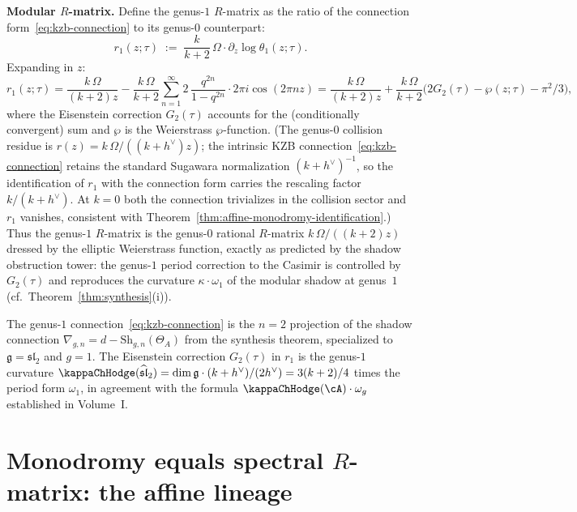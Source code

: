 \begin{computation}
\medskip\noindent\textbf{Modular $R$-matrix.}\;
Define the genus-$1$ $R$-matrix as the ratio of the connection
form~\eqref{eq:kzb-connection} to its genus-$0$ counterpart:
\begin{equation}\label{eq:genus1-r-matrix}
 r_1(z;\tau) \;:=\; \frac{k}{k+2}\,\Omega\cdot \partial_z\!\log\theta_1(z;\tau).
\end{equation}
Expanding in $z$:
\[
 r_1(z;\tau)
 = \frac{k\,\Omega}{(k+2)z}
 - \frac{k\,\Omega}{k+2}\sum_{n=1}^{\infty}2\,
 \frac{q^{2n}}{1-q^{2n}}\cdot 2\pi i\cos(2\pi nz)
 = \frac{k\,\Omega}{(k+2)z}
 + \frac{k\,\Omega}{k+2}\bigl(2G_2(\tau)-\wp(z;\tau)-\pi^2/3\bigr),
\]
where the Eisenstein correction $G_2(\tau)$ accounts for the
(conditionally convergent) sum and $\wp$ is the Weierstrass
$\wp$-function. (The genus-$0$ collision residue is $r(z) = k\,\Omega/((k+h^\vee)z)$; the intrinsic
KZB connection~\eqref{eq:kzb-connection} retains the standard
Sugawara normalization $(k+h^\vee)^{-1}$, so the identification of
$r_1$ with the connection form carries the rescaling factor
$k/(k+h^\vee)$. At $k=0$ both the connection trivializes in the
collision sector and $r_1$ vanishes, consistent with
Theorem~\ref{thm:affine-monodromy-identification}.) Thus the
genus-$1$ $R$-matrix is the genus-$0$
rational $R$-matrix $k\,\Omega/((k+2)z)$ dressed by the elliptic
Weierstrass function, exactly as predicted by the shadow obstruction tower:
the genus-$1$ period correction to the Casimir is controlled by
$G_2(\tau)$ and reproduces the curvature $\kappa\cdot\omega_1$
of the modular shadow at genus~$1$
(cf.\ Theorem~\ref{thm:synthesis}\textup{(i)}).
\end{computation}

\begin{remark}
\label{rem:kzb-shadow-consistency}
The genus-$1$ connection~\eqref{eq:kzb-connection} is the $n=2$ projection
of the shadow connection $\nabla_{g,n}=d-\mathrm{Sh}_{g,n}(\Theta_A)$
from the synthesis theorem, specialized to $\mathfrak{g}=\mathfrak{sl}_2$
and $g=1$. The Eisenstein correction $G_2(\tau)$ in $r_1$
is the genus-$1$ curvature $\kappaChHodge(\widehat{\mathfrak{sl}}_2)
=\dim\mathfrak{g}\cdot(k+h^\vee)/(2h^\vee)=3(k+2)/4$
times the period form $\omega_1$, in agreement with the formula
$\kappaChHodge(\cA)\cdot\omega_g$ established in Volume~I.
\end{remark}

\section{Monodromy equals spectral $R$-matrix: the affine lineage}\label{sec:affine-monodromy-identification}

